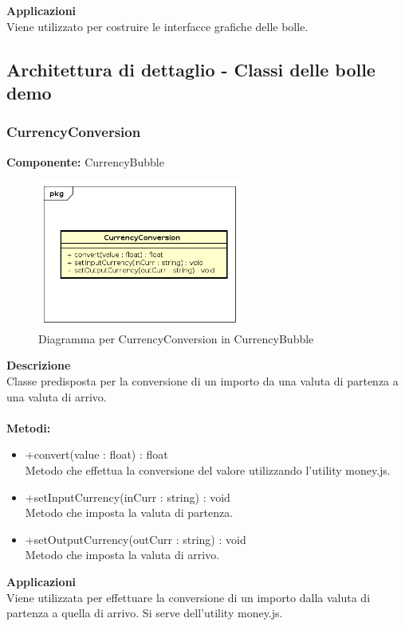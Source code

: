 \textbf{Applicazioni}\\
Viene utilizzato per costruire le interfacce grafiche delle bolle. 


\subsection{Architettura di dettaglio - Classi delle bolle demo}\subsubsection{CurrencyConversion}
\textbf{Componente:}  CurrencyBubble\\
   \FloatBarrier
   \begin{figure}[ht]
   \centering
   \includegraphics[width=0.6\textwidth]{img/single-CurrencyConversion}
   \caption{{Diagramma per CurrencyConversion in CurrencyBubble}}
\end{figure}
\FloatBarrier
\textbf{Descrizione}\\
Classe predisposta per la conversione di un importo da una valuta di partenza a una valuta di arrivo.
\\
\\
\textbf{Metodi:} 
\begin{itemize}
\item +convert(value : float) : float 
\\
Metodo che effettua la conversione del valore utilizzando l'utility money.js.
\item +setInputCurrency(inCurr : string) : void 
\\
Metodo che imposta la valuta di partenza.
\item +setOutputCurrency(outCurr : string) : void 
\\
Metodo che imposta la valuta di arrivo.
\end{itemize} 


\textbf{Applicazioni}\\
Viene utilizzata per effettuare la conversione di un importo dalla valuta di partenza a quella di arrivo. Si serve dell'utility money.js. 


